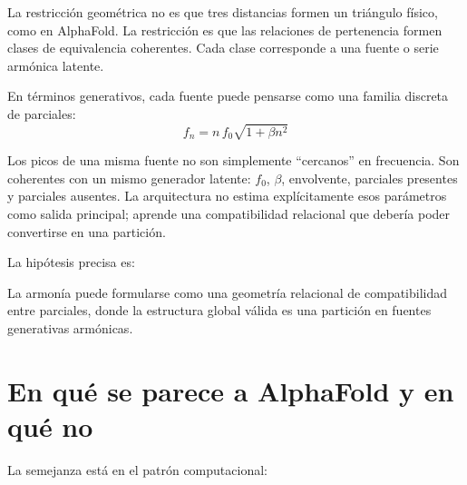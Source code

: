 \documentclass[11pt]{article}
\begin{document}
La restricción geométrica no es que tres distancias formen un triángulo físico, como en AlphaFold. La restricción es que las relaciones de pertenencia formen clases de equivalencia coherentes. Cada clase corresponde a una fuente o serie armónica latente.

En términos generativos, cada fuente puede pensarse como una familia discreta de parciales:
\[
  f_n = n\,f_0\sqrt{1+\beta n^2}
\]

Los picos de una misma fuente no son simplemente ``cercanos'' en frecuencia. Son coherentes con un mismo generador latente: $f_0$, $\beta$, envolvente, parciales presentes y parciales ausentes. La arquitectura no estima explícitamente esos parámetros como salida principal; aprende una compatibilidad relacional que debería poder convertirse en una partición.

La hipótesis precisa es:

\begin{goldbox}
La armonía puede formularse como una geometría relacional de compatibilidad entre parciales, donde la estructura global válida es una partición en fuentes generativas armónicas.
\end{goldbox}

\section{En qué se parece a AlphaFold y en qué no}

La semejanza está en el patrón computacional:
\end{document}
